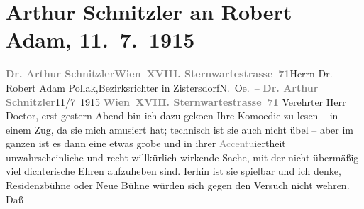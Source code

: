 

         
         \newcommand{\erwaehntePersonen}{Personen: Robert Adam}
         \newcommand{\erwaehnteOrte}{Orte: Kammerspiele Wien, Neue Wiener Bühne, Niederösterreich, Sternwartestraße, Wien, Zistersdorf}
         \newcommand{\erwaehnteWerke}{Werke: Gesellschaft [Eine Gaunerkomödie]}
               \section[Arthur Schnitzler an Robert Adam, 11. 7. 1915]{ Arthur Schnitzler an Robert Adam, 11. 7. 1915}\nopagebreak{}\rehead{ }\begin{ledgroupsized}[t]{13cm}\normalsize\beginnumbering \toendnotes[C]{\smallbreak\pagebreak[2]} 
\toendnotes[C]{\smallbreak}\pstart{}{\pb}\textcolor{gray}{\textbf{Dr. Arthur Schnitzler}}\pend{}\pstart{}\textcolor{gray}{\textbf{Wien XVIII. Sternwartestrasse 71}}\pend{}{\bigskip}\pstart{}{\pb}Herrn Dr. Robert Adam
                        Pollak,\pend{}\pstart{}Bezirksrichter in Zistersdorf\pend{}\pstart{}N. Oe. –
                    \pend{}{\bigskip}\pstart
           \noindent{}{\pb}\textcolor{gray}{\textbf{Dr. Arthur Schnitzler}}\hfill 11/7 1915\pend
           \pstart
           \textcolor{gray}{\textbf{Wien XVIII. Sternwartestrasse 71}}\pend
           \pstart
           Verehrter Herr Doctor, erst gestern Abend bin ich dazu geko{\geminationm}en Ihre Komoedie zu lesen – in einem Zug, da sie mich
                    amusiert hat; technisch ist sie auch nicht übel – aber im ganzen ist es dann
                    eine etwas grobe und in ihrer \textcolor{gray}{Accentu}iertheit
                    unwahrscheinliche und recht willkürlich wirkende Sache, mit der nicht übermäßig
                        \introOben{}viel\introOben{} dichterische Ehren aufzuheben sind. I{\geminationm}erhin ist sie spielbar und ich denke, Residenzbühne oder Neue Bühne würden sich gegen den Versuch nicht wehren. Daß

\end{ledgroupsized}
